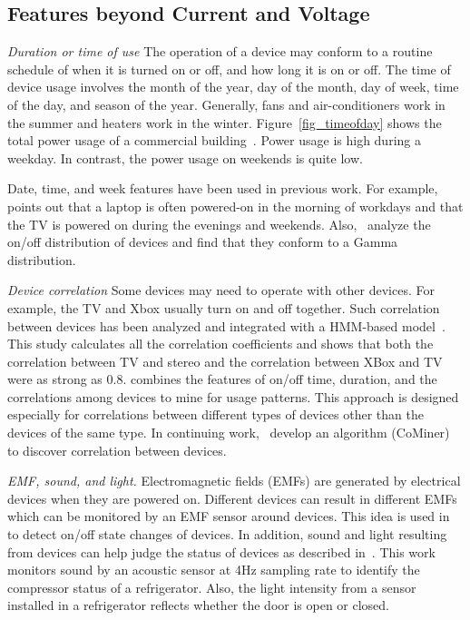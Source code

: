 
\subsection{Features beyond Current and Voltage}

\textit{Duration or time of use}
The operation of a device may conform to
a routine schedule of
when it is turned on or off,
and how long it is on or off.
The time of device usage involves the
month of the year, day of the month, day of week, time of the day,
and season of the year.
Generally, fans and air-conditioners
work in the summer and heaters work in the winter.
Figure~\ref{fig_timeofday} shows 
the total power usage of a commercial building~\cite{shao2013temporal}.
Power usage is high during a weekday. 
In contrast, the power usage on weekends is quite low. 

Date, time, and week features have been used in previous work.
For example,~\cite{kim2011unsupervised} points out that
a laptop is often powered-on in the morning of workdays
and that the TV is powered on during the evenings and weekends. 
Also,~\cite{kim2011unsupervised} analyze the on/off
distribution of devices and find that
they conform to a Gamma distribution.

\textit{Device correlation}
Some devices may need to operate with other devices.
For example, the TV and Xbox usually turn on and off
together.
Such correlation between devices has been
analyzed and integrated with a HMM-based model~\cite{kim2011unsupervised}.
This study calculates all the correlation coefficients and 
shows that 
both the correlation between TV and stereo
and the correlation between XBox and TV were as strong as 0.8.
\cite{chen2013novel} combines the features of on/off time, duration, and the correlations 
among devices to mine for usage patterns. This approach is 
designed especially for 
correlations between different 
types of devices other than the devices of the same type. 
In continuing work,~\cite{chen2014mining} develop an algorithm (CoMiner) to discover 
correlation between devices. 

\textit{EMF, sound, and light.}
Electromagnetic fields (EMFs)
are generated by electrical devices
when they are powered on.
Different devices can result in different EMFs which
can be monitored by an EMF sensor around devices.
This idea is used in~\cite{giri_study_2012}
to detect on/off state changes of devices.
In addition, sound and light resulting from
devices can help judge the status
of devices as described in~\cite{kim2009viridiscope}.
This work monitors sound by an acoustic sensor 
at 4Hz sampling rate
to identify the compressor status of a refrigerator. 
Also, the light intensity from a sensor installed in a refrigerator reflects 
whether the door is open or closed.

